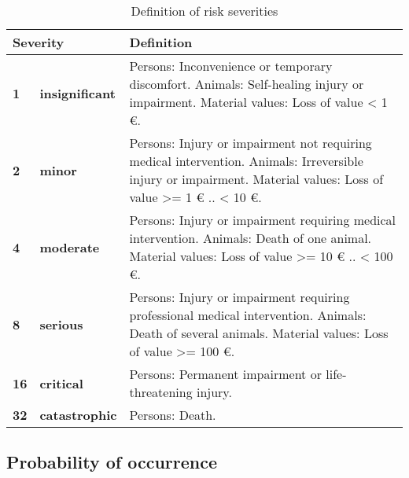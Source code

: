 \documentclass{../../git_submodules/common_docu/doc_class}
\begin{document}
  \begin{table}[H]
    \begin{tabularx}{\textwidth}{|ll|X|}
      \hline
      \multicolumn{2}{|l|}{\textbf{Severity}} & \textbf{Definition} \\
      \hline
      \textbf{1} & \textbf{insignificant} & Persons: Inconvenience or temporary discomfort. \newline
      Animals: Self-healing injury or impairment. \newline
      Material values: Loss of value \textless{} 1 \euro. \\
      \hline
      \textbf{2} & \textbf{minor} & Persons: Injury or impairment not requiring medical intervention. \newline
      Animals: Irreversible injury or impairment.\newline
      Material values: Loss of value \textgreater= 1 \euro{} .. \textless{} 10 \euro. \\
      \hline
      \textbf{4} & \textbf{moderate} & Persons: Injury or impairment requiring medical intervention. \newline
      Animals: Death of one animal. \newline
      Material values: Loss of value \textgreater= 10 \euro{} .. \textless{} 100 \euro. \\
      \hline
      \textbf{8} & \textbf{serious} & Persons: Injury or impairment requiring professional medical intervention. \newline
      Animals: Death of several animals. \newline
      Material values: Loss of value \textgreater= 100 \euro. \\
      \hline
      \textbf{16} & \textbf{critical} & Persons: Permanent impairment or life-threatening injury. \\
      \hline
      \textbf{32} & \textbf{catastrophic} & Persons: Death.\\
      \hline
    \end{tabularx}
    \caption{Definition of risk severities}
  \end{table}


\subsection{Probability of occurrence}
\end{document}
